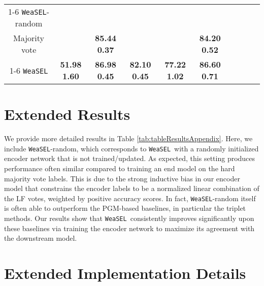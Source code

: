 \documentclass{article}
\newcommand{\weasel}{\texttt{WeaSEL}}\newcommand{\brackets}[1]{\left( #1 \right)}
\newcommand{\first}[1]{{\color{blue}\textbf{#1}}}
\newcommand{\second}[1]{{\textbf{#1}}}
\begin{document}
\begin{table*}[h!]
{\begin{tabular}{c|ccccccccc|}
             &
             &
             &
             \\\cline{1-6}
\weasel-random &
             &
             &
             &
             &
             \\Majority vote &
             &
            \second{85.44  0.37} &
             &
             &
            \second{84.20  0.52} \\\cline{1-6}
        \weasel  & 
            \first{51.98  1.60} &
            \first{86.98  0.45} &
            \second{82.10  0.45} &
            \first{77.22  1.02} &
            \first{86.60  0.71}\\ \bottomrule
    \end{tabular}
    \label{tab:tableResultsAppendix}
}
\end{table*}
 \section{Extended Results} \label{sec:resultsAppendix}
We provide more detailed results in Table \ref{tab:tableResultsAppendix}.
Here, we include \weasel-random, which corresponds to \weasel\ with a randomly initialized encoder network that is not trained/updated. As expected, this setting produces performance often similar compared to training an end model on the hard majority vote labels. This is due to the strong inductive bias in our encoder model that constrains the encoder labels to be a normalized linear combination of the LF votes, weighted by positive accuracy scores.
In fact, \weasel-random itself is often able to outperform the PGM-based baselines, in particular the triplet methods.
Our results show that \weasel\ consistently improves significantly upon these baselines via training the encoder network to maximize its agreement with the downstream model.


\section{Extended Implementation Details}
\label{sec:implDetails}
\end{document}
